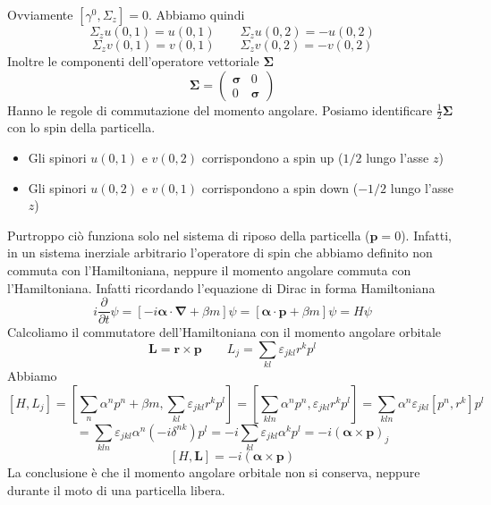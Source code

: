 Ovviamente $\left[\gamma^0,\Sigma_z\right]=0$. Abbiamo quindi
$$
\Sigma_z u(0,1) = u(0,1) \qquad \Sigma_z u(0,2) = -u(0,2)
$$
$$
\Sigma_z v(0,1) = v(0,1) \qquad \Sigma_z v(0,2) = -v(0,2)
$$
Inoltre le componenti dell'operatore vettoriale $\boldsymbol{\Sigma}$
$$
\boldsymbol{\Sigma} = \begin{pmatrix} \boldsymbol{\sigma} & 0 \\ 0 & \boldsymbol{\sigma} \end{pmatrix}
$$
Hanno le regole di commutazione del momento angolare. Posiamo identificare $\frac{1}{2}\boldsymbol{\Sigma}$ con lo spin della particella.
\begin{itemize}
    \item Gli spinori $u(0,1)$ e $v(0,2)$ corrispondono a spin up ($1/2$ lungo l'asse $z$)
    \item Gli spinori $u(0,2)$ e $v(0,1)$ corrispondono a spin down ($-1/2$ lungo l'asse $z$)
\end{itemize}
Purtroppo ciò funziona solo nel sistema di riposo della particella ($\mathbf{p}=0$). Infatti, in un sistema inerziale arbitrario l'operatore di spin che abbiamo definito non commuta con l'Hamiltoniana, neppure il momento angolare commuta con l'Hamiltoniana. Infatti ricordando l'equazione di Dirac in forma Hamiltoniana
$$
i \frac{\partial}{\partial t} \psi = [-i\boldsymbol{\alpha} \cdot \boldsymbol{\nabla} + \beta m]\psi = [\boldsymbol{\alpha} \cdot \mathbf{p} + \beta m]\psi = H\psi
$$
Calcoliamo il commutatore dell'Hamiltoniana con il momento angolare orbitale
$$
\mathbf{L} = \mathbf{r} \times \mathbf{p} \qquad L_j = \sum_{kl} \varepsilon_{jkl} r^k p^l
$$
Abbiamo
$$
[H, L_j] = \left[ \sum_n \alpha^n p^n + \beta m, \sum_{kl} \varepsilon_{jkl} r^k p^l \right] = \left[ \sum_{kln} \alpha^n p^n, \varepsilon_{jkl} r^k p^l \right] = \sum_{kln} \alpha^n \varepsilon_{jkl} [p^n, r^k] p^l
$$
$$
= \sum_{kln} \varepsilon_{jkl} \alpha^n (-i\delta^{nk}) p^l = -i \sum_{kl} \varepsilon_{jkl} \alpha^k p^l = -i(\boldsymbol{\alpha} \times \mathbf{p})_j
$$
$$
[H, \mathbf{L}] = -i(\boldsymbol{\alpha} \times \mathbf{p})
$$
La conclusione è che il momento angolare orbitale non si conserva, neppure durante il moto di una particella libera.
